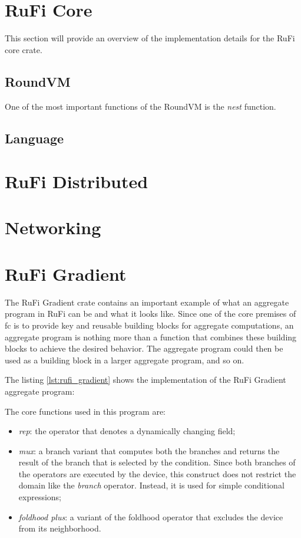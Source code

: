 \section{RuFi Core}
This section will provide an overview of the implementation details for the RuFi core crate.

\subsection{RoundVM}
One of the most important functions of the RoundVM is the \textit{nest} function. 

\subsection{Language}

\section{RuFi Distributed}

\section{Networking}


\section{RuFi Gradient}
The RuFi Gradient crate contains an important example of what an aggregate program in RuFi can be and what it looks like. Since one of the core premises of \ac{fc} is to
provide key and reusable building blocks for aggregate computations, an aggregate program is nothing more than a function that combines these building blocks to achieve the
desired behavior. The aggregate program could then be used as a building block in a larger aggregate program, and so on.

The listing \ref{lst:rufi_gradient} shows the implementation of the RuFi Gradient aggregate program:



The core functions used in this program are:

\begin{itemize}
    \item \textit{rep}: the operator that denotes a dynamically changing field;
    \item \textit{mux}: a branch variant that computes both the branches and returns the result of the branch that is selected by the condition. Since both branches of the operators
          are executed by the device, this construct does not restrict the domain like the \textit{branch} operator. Instead, it is used for simple conditional expressions;
    \item \textit{foldhood plus}: a variant of the foldhood operator that excludes the device from its neighborhood.
\end{itemize}

